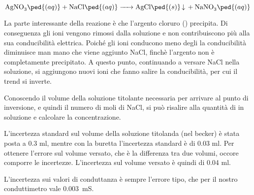 \begin{equation*}
        \ce{AgNO3\ped{(aq)} + NaCl\ped{(aq)} -> AgCl\ped{(s)} v + NaNO3\ped{(aq)}}
\end{equation*}

La parte interessante della reazione è che l'argento cloruro () precipita. Di conseguenza gli ioni 
vengono rimossi dalla soluzione e non contribuiscono più alla sua conducibilità elettrica.
Poiché gli ioni  conducono meno degli  la conducibilità diminuisce man mano che viene aggiunto NaCl,
finchè l'argento non è completamente precipitato. A questo punto, continuando a versare NaCl nella soluzione, si aggiungono nuovi ioni  che fanno salire la conducibilità,
per cui il trend si inverte.

Conoscendo il volume della soluzione titolante necessaria per arrivare al punto di inversione, e quindi il numero di moli
di NaCl, si può risalire alla quantità di  in soluzione e calcolare la concentrazione.

L'incertezza standard sul volume della soluzione titolanda (nel becker) è stata posta a 0.3 ml, mentre con la
buretta l'incertezza standard è di 0.03 ml. Per ottenere l'errore sul volume versato, che è la differenza tra due volumi,
occore comporre le incertezze. L'incertezza sul volume versato è quindi di 0.04 ml.

L'incertezza sui valori di conduttanza è sempre l'errore tipo, che per il nostro conduttimetro vale \SI{0.003}{\milli\siemens}.
